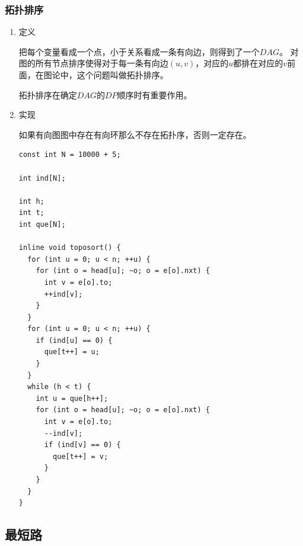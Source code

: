 \documentclass[11pt]{article}
\begin{document}
\subsubsection{拓扑排序}
\label{sec-2-5-2}

\begin{enumerate}
\item 定义
\label{sec-2-5-2-1}

把每个变量看成一个点，小于关系看成一条有向边，则得到了一个\(DAG\)。 对图的所有节点排序使得对于每一条有向边\((u,v)\)，对应的\(u\)都排在对应的\(v\)前面，在图论中，这个问题叫做拓扑排序。

拓扑排序在确定\(DAG\)的\(DP\)顺序时有重要作用。

\item 实现
\label{sec-2-5-2-2}

如果有向图图中存在有向环那么不存在拓扑序，否则一定存在。

\begin{verbatim}
const int N = 10000 + 5;

int ind[N];

int h;
int t;
int que[N];

inline void toposort() {
  for (int u = 0; u < n; ++u) {
    for (int o = head[u]; ~o; o = e[o].nxt) {
      int v = e[o].to;
      ++ind[v];
    }
  }
  for (int u = 0; u < n; ++u) {
    if (ind[u] == 0) {
      que[t++] = u;
    }
  }
  while (h < t) {
    int u = que[h++];
    for (int o = head[u]; ~o; o = e[o].nxt) {
      int v = e[o].to;
      --ind[v];
      if (ind[v] == 0) {
        que[t++] = v;
      }
    }
  }
}
\end{verbatim}
\end{enumerate}
\subsection{最短路}
\label{sec-2-6}
\end{document}
